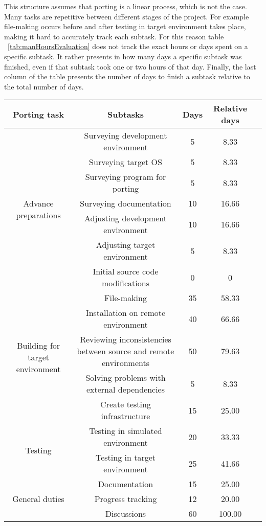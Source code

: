 This structure assumes that porting is a linear process, which is not the case.
Many tasks are repetitive between different stages of the project. For example
file-making occurs before and after testing in target environment takes place,
making it hard to accurately track each subtask. For this reason table
~\ref{tab:manHoursEvaluation} does not track the exact hours or days spent
on a specific subtask. It rather presents in how many days a specific subtask
was finished, even if that subtask took one or two hours of that day. Finally,
the last column of the table presents the number of days to finish a subtask
relative to the total number of days.

\begin{table*}
\centering
\begin{tabular}{ |c|c|c|c|c| }
\hline
Porting task & Subtasks & Days & Relative days \\
\hline
\multirow{7}{5em}{Advance preparations} & Surveying development environment & 5 & 8.33\\
& Surveying target OS & 5 & 8.33 \\
& Surveying program for porting & 5 & 8.33 \\
& Surveying documentation & 10 & 16.66 \\
& Adjusting development environment & 10 & 16.66 \\
& Adjusting target environment & 5 & 8.33 \\
& Initial source code modifications & 0 & 0 \\
\hline
\multirow{5}{5em}{Building for target environment} & File-making & 35  & 58.33\\
& Installation on remote environment & 40 & 66.66 \\
& Reviewing inconsistencies between source and remote environments & 50 & 79.63 \\
& Solving problems with external dependencies & 5 & 8.33 \\
& Create testing infrastructure & 15 & 25.00 \\
\hline
\multirow{2}{5em}{Testing} & Testing in simulated environment & 20  & 33.33\\
& Testing in target environment & 25 & 41.66 \\
\hline
\multirow{3}{5em}{General duties} & Documentation & 15  & 25.00 \\
& Progress tracking & 12 & 20.00 \\
& Discussions & 60 & 100.00 \\
\hline
\end{tabular}
\caption{Man-days evaluation for porting tasks (TODO: I thought much about this table
and I think it is not relevant to have the relative procents of work as we do not
track accurately the man-days. We must either track more accurately the progress
or change the meaning of this table)}
\label{tab:manHoursEvaluation}
\end{table*}

